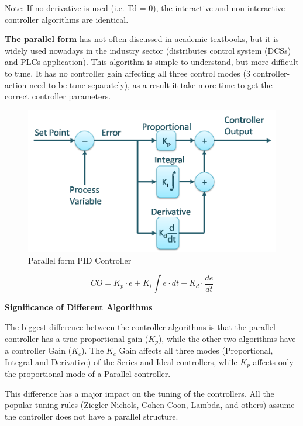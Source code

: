 Note: If no derivative is used (i.e. Td = 0), the interactive and non interactive controller algorithms are identical. 

\textbf{The parallel form} has not often discussed in academic textbooks, but it is widely used nowadays in the  industry sector (distributes control system (DCSs) and PLCs application). This algorithm is simple to understand, but more difficult to tune. It has no controller gain affecting all three control modes (3 controller-action need to be tune separately), as a result it take more time to get the correct controller parameters. 


\begin{figure}[H]
	\centering
	\includegraphics[width=0.8\columnwidth]{Pictures/parallel.png}
	\caption[Short title]{Parallel form PID Controller \cite{PID}}
	\label{figure: Parallel PID}
\end{figure}

\begin{equation}
\label{eqn:3}
    CO = K_p\cdot e + K_i\int e\cdot dt +K_d\cdot\frac{de}{dt}
\end{equation}

\textbf{Significance of Different Algorithms }

The biggest difference between the controller algorithms is that the parallel controller has a true proportional gain ($K_p$), while the other two algorithms have a controller Gain ($K_c$). The  $K_c$ Gain affects all three modes (Proportional, Integral and Derivative) of the Series and Ideal controllers, while $K_p$  affects only the proportional mode of a Parallel controller. 

This difference has a major impact on the tuning of the controllers. All the popular tuning rules (Ziegler-Nichols, Cohen-Coon, Lambda, and others) assume the controller does not have a parallel structure. 

